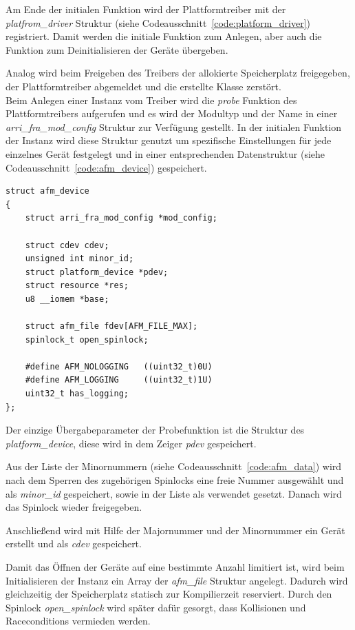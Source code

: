 Am Ende der initialen Funktion wird der Plattformtreiber mit der \textit{platfrom\_driver} Struktur (siehe Codeausschnitt~\ref{code:platform_driver}) registriert. Damit werden die initiale Funktion zum Anlegen, aber auch die Funktion zum Deinitialisieren der Geräte übergeben.


Analog wird beim Freigeben des Treibers der allokierte Speicherplatz freigegeben, der Plattformtreiber abgemeldet und die erstellte Klasse zerstört.\\


Beim Anlegen einer Instanz vom Treiber wird die \textit{probe} Funktion des Plattformtreibers aufgerufen und es wird der Modultyp und der Name in einer \textit{arri\_fra\_mod\_config} Struktur zur Verfügung gestellt. In der initialen Funktion der Instanz wird diese Struktur genutzt um spezifische Einstellungen für jede einzelnes Gerät festgelegt und in einer entsprechenden Datenstruktur (siehe Codeausschnitt~\ref{code:afm_device}) gespeichert. 

\begin{lstfloat}
\begin{lstlisting}
struct afm_device 
{
	struct arri_fra_mod_config *mod_config;

	struct cdev cdev;
	unsigned int minor_id;
	struct platform_device *pdev;
	struct resource *res;
	u8 __iomem *base;
	
	struct afm_file fdev[AFM_FILE_MAX];
	spinlock_t open_spinlock;
	
	#define AFM_NOLOGGING   ((uint32_t)0U)
	#define AFM_LOGGING     ((uint32_t)1U)
	uint32_t has_logging;
};
\end{lstlisting}
\end{lstfloat}

Der einzige Übergabeparameter der Probefunktion ist die Struktur des \textit{platform\_device}, diese wird in dem Zeiger \textit{pdev} gespeichert. 

Aus der Liste der Minornummern (siehe Codeausschnitt~\ref{code:afm_data}) wird nach dem Sperren des zugehörigen Spinlocks eine freie Nummer ausgewählt und als \textit{minor\_id} gespeichert, sowie in der Liste als verwendet gesetzt. Danach wird das Spinlock wieder freigegeben.

Anschließend wird mit Hilfe der Majornummer und der Minornummer ein Gerät erstellt und als \textit{cdev} gespeichert. 

Damit das Öffnen der Geräte auf eine bestimmte Anzahl limitiert ist, wird beim Initialisieren der Instanz ein Array der \textit{afm\_file} Struktur angelegt. Dadurch wird gleichzeitig der Speicherplatz statisch zur Kompilierzeit reserviert. Durch den Spinlock \textit{open\_spinlock} wird später dafür gesorgt, dass Kollisionen und Raceconditions vermieden werden.

